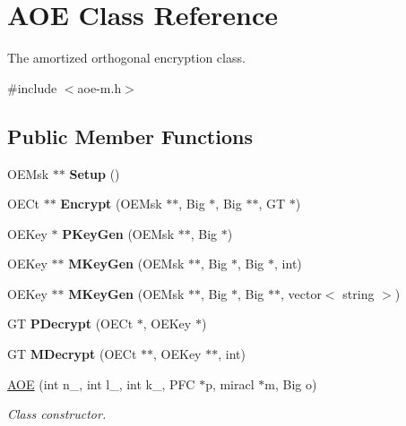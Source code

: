 \hypertarget{classAOE}{\section{A\-O\-E Class Reference}
\label{classAOE}
}


The amortized orthogonal encryption class.  




{\ttfamily \#include $<$aoe-\/m.\-h$>$}

\subsection*{Public Member Functions}
\begin{DoxyCompactItemize}
\item 
\hypertarget{classAOE_a5541942137f6423708d83a538433f4f1}{O\-E\-Msk $\ast$$\ast$ {\bfseries Setup} ()}\label{classAOE_a5541942137f6423708d83a538433f4f1}

\item 
\hypertarget{classAOE_a82e280b24bb32b82ea2a720807b46a2f}{O\-E\-Ct $\ast$$\ast$ {\bfseries Encrypt} (O\-E\-Msk $\ast$$\ast$, Big $\ast$, Big $\ast$$\ast$, G\-T $\ast$)}\label{classAOE_a82e280b24bb32b82ea2a720807b46a2f}

\item 
\hypertarget{classAOE_a906b3446aeb222ae736e0b3f3713bbc5}{O\-E\-Key $\ast$ {\bfseries P\-Key\-Gen} (O\-E\-Msk $\ast$$\ast$, Big $\ast$)}\label{classAOE_a906b3446aeb222ae736e0b3f3713bbc5}

\item 
\hypertarget{classAOE_a51e0488fcfb885ff9e896beb1c9cc6ac}{O\-E\-Key $\ast$$\ast$ {\bfseries M\-Key\-Gen} (O\-E\-Msk $\ast$$\ast$, Big $\ast$, Big $\ast$, int)}\label{classAOE_a51e0488fcfb885ff9e896beb1c9cc6ac}

\item 
\hypertarget{classAOE_acccc5c46c33a8c835604ed9a0be30115}{O\-E\-Key $\ast$$\ast$ {\bfseries M\-Key\-Gen} (O\-E\-Msk $\ast$$\ast$, Big $\ast$, Big $\ast$$\ast$, vector$<$ string $>$)}\label{classAOE_acccc5c46c33a8c835604ed9a0be30115}

\item 
\hypertarget{classAOE_a616c7b95e29156c8f2b6ecdd962d4a86}{G\-T {\bfseries P\-Decrypt} (O\-E\-Ct $\ast$, O\-E\-Key $\ast$)}\label{classAOE_a616c7b95e29156c8f2b6ecdd962d4a86}

\item 
\hypertarget{classAOE_a2734fc4f2fa9aeef2d36c85a27528842}{G\-T {\bfseries M\-Decrypt} (O\-E\-Ct $\ast$$\ast$, O\-E\-Key $\ast$$\ast$, int)}\label{classAOE_a2734fc4f2fa9aeef2d36c85a27528842}

\item 
\hyperlink{classAOE_a6950dbd129bb9eb6ff919004d4482141}{A\-O\-E} (int n\-\_\-, int l\-\_\-, int k\-\_\-, P\-F\-C $\ast$p, miracl $\ast$m, Big o)
\begin{DoxyCompactList}\small\item\em Class constructor. \end{DoxyCompactList}\end{DoxyCompactItemize}
